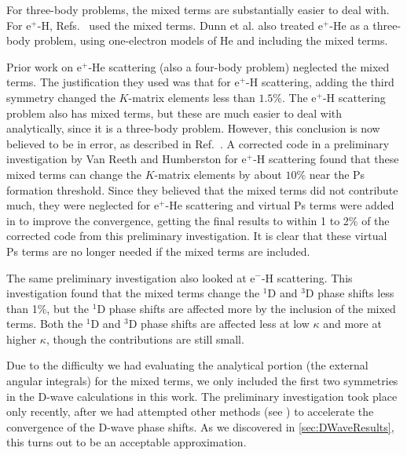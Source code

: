 \documentclass[Dissertation.tex]{subfiles}
\begin{document}
For three-body problems, the mixed terms are substantially easier to deal
with. For e$^+$-H, Refs.~\cite{Brown1985a,BrownThesis,WattsThesis,Humberston1997,VanReeth1997}
used the mixed terms. Dunn et al. \cite{Dunn2000,DunnThesis} also treated
e$^+$-He as a three-body problem, using one-electron models of He and
including the mixed terms.

Prior work \cite{VanReeth1997,VanReethThesis} on e$^+$-He scattering (also a
four-body problem) neglected the mixed terms. The justification they used was
that for e$^+$-H scattering, adding the third symmetry changed the $K$-matrix
elements less than $1.5\%$. The e$^+$-H scattering problem also has mixed
terms, but these are much easier to deal with analytically, since it is a
three-body problem. However, this conclusion is now believed to be in error, as
described in Ref.~\cite{Woods2015}. A corrected code in a preliminary
investigation by Van Reeth and Humberston \cite{VanReeth2015} for e$^+$-H
scattering found that these mixed terms can change the $K$-matrix elements by
about $10\%$ near the Ps formation threshold. Since they believed that the
mixed terms did not contribute much, they were neglected for e$^+$-He scattering
and virtual Ps terms were added in to improve the convergence, getting the final
results to within 1 to 2\% of the corrected code from this preliminary
investigation. It is clear that these virtual Ps terms are no longer needed if
the mixed terms are included.

The same preliminary investigation \cite{VanReeth2015} also looked at e$^-$-H
scattering. This investigation found that the mixed terms change the $^1$D and
$^3$D phase shifts less than 1\%, but the $^1$D phase shifts are affected more
by the inclusion of the mixed terms. Both the $^1$D and $^3$D phase shifts are
affected less at low $\kappa$ and more at higher $\kappa$, though the
contributions are still small.

Due to the difficulty we had evaluating the analytical portion (the external
angular integrals) for the mixed terms, we only included the first two
symmetries in the D-wave calculations in this work. The preliminary investigation
\cite{VanReeth2015} took place only recently, after we had attempted other
methods (see \cite{chp:Unfinished}) to accelerate the convergence
of the D-wave phase shifts. As we discovered in \cref{sec:DWaveResults}, this
turns out to be an acceptable approximation.
\end{document}

